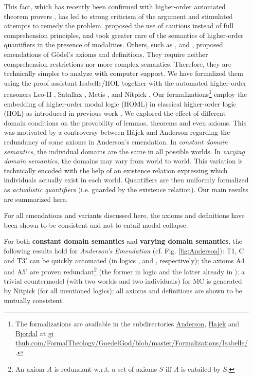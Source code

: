 \documentclass{birkjour}
\theoremstyle{definition}
\theoremstyle{remark}
\numberwithin{equation}{section}
\begin{document}
This fact, which
has recently been confirmed with higher-order automated theorem
provers \citep{C40,J30}, has led to strong criticism of the argument
and stimulated attempts to remedy the problem.
\citet{Hajek_Magari_and_others_1996,Hajek_der_Mathematiker_2001}
proposed the use of cautious instead of full comprehension principles,
and \citet{fitting02:_types_tableaus_god} took
greater care of the semantics of higher-order quantifiers
in the presence of modalities. Others, such as
\citet{anderson90:_some_emend_of_goedel_ontol_proof}, \citet{Hajek2002}
and \citet{bjordal99}, proposed emendations of G\"odel's
axioms and definitions. They require neither comprehension
restrictions nor more complex semantics. Therefore, they are
technically simpler to analyze with computer support. We have
formalized them using the proof assistant Isabelle/HOL \citep{Isabelle}
together with the automated higher-order reasoners Leo-II \citep{C26},
Satallax \citep{brown2012satallax}, Metis
\citep{Hurd03first-orderproof}, and Nitpick \citep{Nitpick}.   Our
formalizations\footnote{The   formalizations are available in the
subdirectories \url{Anderson}, \url{Hajek} and \url{Bjordal} at \url{gi
thub.com/FormalTheology/GoedelGod/blob/master/Formalizations/Isabelle/
}.} employ the embedding of higher-order modal logic (HOML) in
classical higher-order logic (HOL) as introduced in previous work
\citep{C40,J30,J23}. We explored the effect of different domain
conditions on the provability of lemmas, theorems and even axioms.
This was motivated by a controversy between Hájek and Anderson
regarding the redundancy of some axioms in Anderson's emendation. In
\emph{constant domain semantics}, the individual domains are the same
in all possible worlds. In \emph{varying domain semantics}, the
domains may vary from world to world. This variation is technically
encoded with the help of an existence relation expressing which
individuals actually exist in each world. Quantifiers are then
uniformly formalized as \emph{actualistic quantifiers} (i.e. guarded by
the existence relation). Our main results are summarized here.

For all emendations and variants discussed here, the axioms and
definitions have been shown to be consistent and not to entail modal
collapse.

For both \textbf{constant domain semantics} and \textbf{varying domain
semantics}, the following results hold for \emph{Anderson's
Emendation} (cf. Fig. \ref{fig:Anderson}): T1, C
and T3' can be quickly automated (in logics \K, \K and \KB,
respectively); the axioms A4 and A5' are proven redundant\footnote{
An axiom $A$ is redundant w.r.t. a set of axioms $S$ iff $A$ is
entailed by $S$.  } (the former in logic \KFourB and the latter
already in \K); a trivial countermodel (with two worlds and  two
individuals) for MC is generated by Nitpick (for all mentioned
logics); all axioms and definitions are shown to be mutually
consistent.
\end{document}
